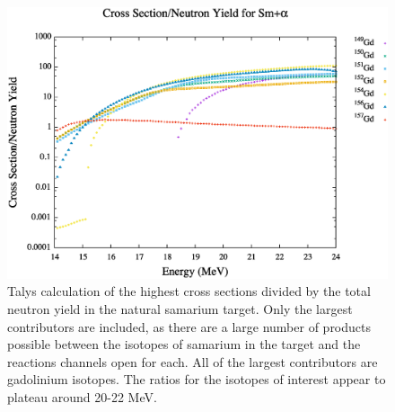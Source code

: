 \begin{figure}[!]
    \centering
    \includegraphics[scale=0.5]{Setup_Figs/Talys_Ratio.eps}
    \caption{Talys calculation of the highest cross sections divided by the total neutron yield in the natural samarium target. Only the largest contributors are included, as there are a large number of products possible between the isotopes of samarium in the target and the reactions channels open for each. All of the largest contributors are gadolinium isotopes. The ratios for the isotopes of interest appear to plateau around 20-22 MeV.}
    \label{fig:talys}
\end{figure}
